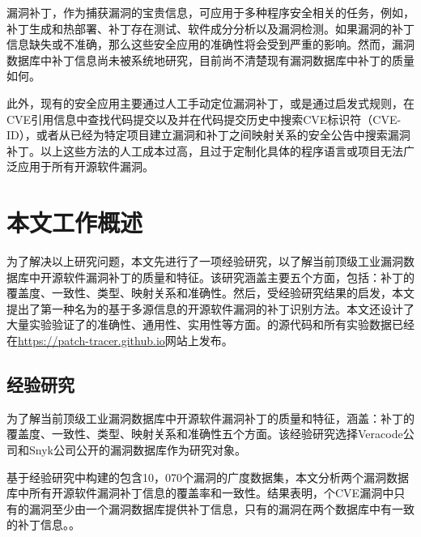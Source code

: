 漏洞补丁，作为捕获漏洞的宝贵信息，可应用于多种程序安全相关的任务，例如，补丁生成和热部署\cite{mulliner2013patchdroid,duan2019automating,xu2020automatic}、补丁存在测试\cite{zhang2018precise,jiang2020pdiff,dai2020bscout}、软件成分分析\cite{ponta2020detection,pashchenko2020vuln4real,Wang2020empirical}以及漏洞检测\cite{li2016vulpecker,li2018vuldeepecker,jang2012redebug,kim2017vuddy, xiao2020mvp, cui2020vuldetector}。如果漏洞的补丁信息缺失或不准确，那么这些安全应用的准确性将会受到严重的影响。然而，漏洞数据库中补丁信息尚未被系统地研究，目前尚不清楚现有漏洞数据库中补丁的质量如何。

此外，现有的安全应用主要通过人工手动定位漏洞补丁\cite{xu2020automatic,jiang2020pdiff,dai2020bscout,zhou2017automated,sabetta2018practical,chen2020machine,xiao2020mvp,ponta2020detection,pashchenko2020vuln4real}，或是通过启发式规则，在CVE引用信息中查找代码提交\cite{duan2019automating,li2016vulpecker,li2018vuldeeepecker}以及并在代码提交历史中搜索CVE标识符（CVE-ID）\cite{you2017semfuzz,Wang2020empirical}，或者从已经为特定项目建立漏洞和补丁之间映射关系的安全公告中搜索漏洞补丁\cite{mulliner2013patchdroid,jang2012redebug,kim2017vuddy}。以上这些方法的人工成本过高，且过于定制化具体的程序语言或项目无法广泛应用于所有开源软件漏洞。

\section{本文工作概述}
为了解决以上研究问题，本文先进行了一项经验研究，以了解当前顶级工业漏洞数据库中开源软件漏洞补丁的质量和特征。该研究涵盖主要五个方面，包括：补丁的覆盖度、一致性、类型、映射关系和准确性。然后，受经验研究结果的启发，本文提出了第一种名为\tool 的基于多源信息的开源软件漏洞的补丁识别方法。本文还设计了大量实验验证了\tool 的准确性、通用性、实用性等方面。\tool 的源代码和所有实验数据已经在\url{https://patch-tracer.github.io}网站上发布。

\subsection{经验研究}
为了解当前顶级工业漏洞数据库中开源软件漏洞补丁的质量和特征，涵盖：补丁的覆盖度、一致性、类型、映射关系和准确性五个方面。该经验研究选择Veracode\cite{veracode}公司和Snyk\cite{snyk}公司公开的漏洞数据库作为研究对象。

基于经验研究中构建的包含10，070个漏洞的广度数据集，本文分析两个漏洞数据库中所有开源软件漏洞补丁信息的覆盖率和一致性。结果表明，个CVE漏洞中只有的漏洞至少由一个漏洞数据库提供补丁信息，只有的漏洞在两个数据库中有一致的补丁信息。。

